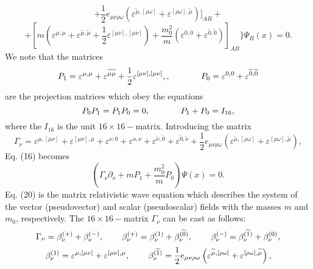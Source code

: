 \documentclass[a4paper,12pt]{article}
\begin{document}
\begin{equation}
+\frac 12 e_{\mu \nu \rho \omega }\left( \varepsilon
^{\widetilde{\mu },[\rho \omega ]}+\varepsilon ^{[\rho \omega
],\widetilde{\mu }}\right) \biggr ] _{AB}+ \label{17}
\end{equation}
\[
+\left[ m\left( \varepsilon ^{\mu ,\mu }+\varepsilon
^{\widetilde{\mu }, \widetilde{\mu }}+\frac 12\varepsilon ^{[\mu
\nu ],[\mu \nu ]}\right) +\frac{m_0^2}{m}\left( \varepsilon
^{0,0}+\varepsilon ^{\widetilde{0},\widetilde{0}}\right) \right]
_{AB}\biggr \}\Psi _B(x)=0 .
\]
We note that the matrices
\begin{equation}
P_1=\varepsilon ^{\mu ,\mu }+\varepsilon ^{\widetilde{\mu
}\widetilde{\mu }}+\frac 12\varepsilon ^{[\mu \nu ],[\mu \nu ]} ,
,\hspace{0.5in}P_0=\varepsilon ^{0,0}+\varepsilon
^{\widetilde{0},\widetilde{0}} \label{18}
\end{equation}
are the projection matrices which obey the equations
\[
P_0 P_1= P_1 P_0=0 ,\hspace{0.5in} P_1+P_0=I_{16} ,
\]
where the $I_{16}$ is the unit $16\times 16-$matrix. Introducing
the matrix
\begin{equation}
\Gamma _\nu =\varepsilon ^{\mu ,[\mu \nu ]}+\varepsilon ^{[\mu \nu
],\mu }+\varepsilon ^{\nu ,0}+\varepsilon ^{o,\nu }+\varepsilon
^{\widetilde{\nu }, \widetilde{0}}+\varepsilon
^{\widetilde{0},\widetilde{\nu }}+\frac 12e_{\mu \nu \rho \omega
}\left( \varepsilon ^{\widetilde{\mu },[\rho \omega ]}+\varepsilon
^{[\rho \omega ],\widetilde{\mu }}\right) , \label{19}
\end{equation}
Eq. (16) becomes
\begin{equation}
\left( \Gamma _\nu \partial _\nu +mP_1+\frac{m_0^2}{m}P_0\right)
\Psi (x)=0 . \label{20}
\end{equation}
Eq. (20) is the matrix relativistic wave equation which describes
the system of the vector (pseudovector) and scalar (pseudoscalar)
fields with the masses $m$ and $m_0$, respectively. The $16\times
16-$matrix $\Gamma _\nu $ can be cast as follows:
\[
\Gamma _\nu =\beta _\nu ^{(+)}+\beta _\nu ^{(-)} ,
\hspace{0.3in}\beta _\nu ^{(+)}=\beta _\nu ^{(1)}+\beta _\nu
^{(\widetilde{0})} ,\hspace{0.3in}\beta _\nu ^{(-)}=\beta _\nu
^{(\widetilde{1})}+\beta _\nu ^{(0)} ,
\]
\begin{equation}
\beta _\nu ^{(1)}=\varepsilon ^{\mu ,[\mu \nu ]}+\varepsilon
^{[\mu \nu ],\mu } ,\hspace{0.3in}\beta _\nu
^{(\widetilde{1})}=\frac 12e_{\mu \nu \rho \omega }\left(
\varepsilon ^{\widetilde{\mu },[\rho \omega ]}+\varepsilon ^{[\rho
\omega ],\widetilde{\mu }}\right) , \label{21}
\end{equation}
\end{document}
